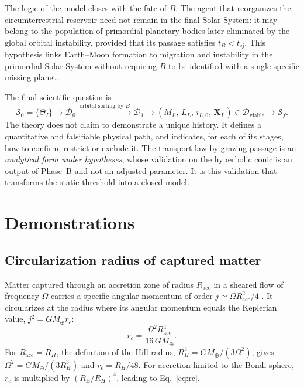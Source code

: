 \documentclass[11pt,a4paper,openany]{report}
\newcommand{\Mt}{M_{\oplus}}
\begin{document}
The logic of the model closes with the fate of $B$. The agent that reorganizes the circumterrestrial
reservoir need not remain in the final Solar System: it may belong to the population of primordial
planetary bodies later eliminated by the global orbital instability, provided that its passage
satisfies $t_B<t_{\mathrm{ej}}$. This hypothesis links Earth--Moon formation to migration and
instability in the primordial Solar System without requiring $B$ to be identified with a single
specific missing planet.

The final scientific question is
\begin{equation}
\boxed{\;\mathcal{S}_0=\{\Theta_I\}\longrightarrow\mathcal{D}_0
\xrightarrow{\;\text{orbital sorting by }B\;}\mathcal{D}_1\longrightarrow
\left(M_L,\,L_L,\,i_{L,0},\,\mathbf{X}_L\right)\in\mathcal{D}_{\mathrm{viable}}
\longrightarrow\mathcal{S}_f.\;}
\label{eq:question}
\end{equation}
The theory does not claim to demonstrate a unique history. It defines a quantitative and
falsifiable physical path, and indicates, for each of its stages, how to confirm, restrict or
exclude it. The transport law by grazing passage is an \emph{analytical form under hypotheses},
whose validation on the hyperbolic conic is an output of Phase~B and not an adjusted parameter. It
is this validation that transforms the static threshold into a closed model.

\appendix

\chapter{Demonstrations}
\label{app:demo}

\section{Circularization radius of captured matter}
\label{app:rc}

Matter captured through an accretion zone of radius $R_{\mathrm{acc}}$ in a sheared flow of
frequency $\Omega$ carries a specific angular momentum of order $j\simeq\Omega R_{\mathrm{acc}}^2/4$
\cite{QuillenTrilling1998}. It circularizes at the radius where its angular momentum equals the
Keplerian value, $j^2=G\Mt r_c$:
\begin{equation}
r_c=\frac{\Omega^2R_{\mathrm{acc}}^4}{16\,G\Mt}.
\end{equation}
For $R_{\mathrm{acc}}=R_H$, the definition of the Hill radius, $R_H^3=G\Mt/(3\Omega^2)$, gives
$\Omega^2=G\Mt/(3R_H^3)$ and $r_c=R_H/48$. For accretion limited to the Bondi sphere, $r_c$ is
multiplied by $(R_{\mathrm{B}}/R_H)^4$, leading to Eq.~\eqref{eq:rc}.
\end{document}
